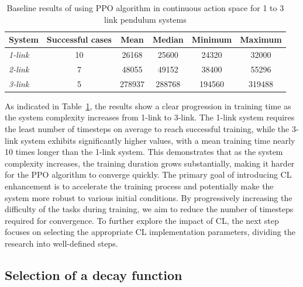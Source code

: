 \begin{table}[ht]
	\centering
	\caption{Baseline results of using PPO algorithm in continuous action space for 1 to 3 link pendulum systems}
	\begin{tabular}{@{}lccccc@{}}
		\toprule
		\textbf{System} & \textbf{Successful cases} & \textbf{Mean} & \textbf{Median} & \textbf{Minimum} & \textbf{Maximum} \\ \midrule
		\textit{1-link} & 10 & 26168 & 25600 & 24320 & 32000 \\
		\textit{2-link} & 7 & 48055 & 49152 & 38400 & 55296 \\
		\textit{3-link} & 5 & 278937 & 288768 & 194560 & 319488 \\ \bottomrule
	\end{tabular}
	\label{tab: baseline statistics for PPO in continuous action space}
\end{table}

As indicated in Table~\ref{tab: baseline statistics for PPO in continuous action space}, the results show a clear progression in training time as the system complexity increases from 1-link to 3-link. The 1-link system requires the least number of timesteps on average to reach successful training, while the 3-link system exhibits significantly higher values, with a mean training time nearly 10 times longer than the 1-link system. This demonstrates that as the system complexity increases, the training duration grows substantially, making it harder for the PPO algorithm to converge quickly.
The primary goal of introducing CL enhancement is to accelerate the training process and potentially make the system more robust to various initial conditions. By progressively increasing the difficulty of the tasks during training, we aim to reduce the number of timesteps required for convergence. To further explore the impact of CL, the next step focuses on selecting the appropriate CL implementation parameters, dividing the research into well-defined steps. 

\subsection{Selection of a decay function} 


